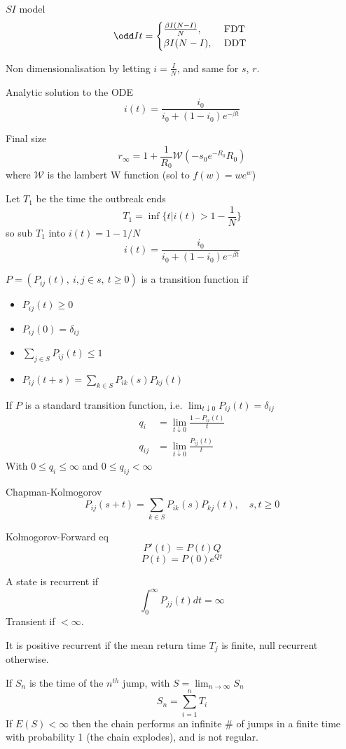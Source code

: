 \documentclass{X:/Documents/Coding/Latex/myassignment}
\begin{document}
$SI$ model
\[\odd It = \begin{cases}
	\frac{\beta I (N-I)}{N}, &\text{ FDT }\\
	\beta I (N-I), &\text{ DDT }\\	
\end{cases}\]

Non dimensionalisation by letting $i=\frac{I}{N}$, and same for $s$, $r$.


Analytic solution to the ODE
\[i(t) = \frac{i_0}{i_0 + (1-i_0)e^{-\beta t}}\]

Final size
\[r_\infty = 1 + \frac1{R_0} \mathcal{W}(-s_0e^{-R_0}R_0)\]
where $\mathcal{W}$ is the lambert W function (sol to $f(w) = we^{w}$)


Let $T_1$ be the time the outbreak ends
\[T_1 = \inf\{t|i(t) > 1-\frac1{N}\}\]
so sub $T_1$ into $i(t) = 1-1/N$
\[i(t) = \frac{i_0}{i_0+(1-i_0)e^{-\beta t}}\]

$P = \left(P_{ij}(t), \ i,j \in s, \ t\geq 0\right)$ is a transition function if
\begin{itemize}
	\item $P_{ij}(t)\geq 0$
	\item $P_{ij}(0) = \delta_{ij}$
	\item $\sum_{j\in S} P_{ij}(t) \leq 1 $
	\item $P_{ij}(t+s) = \sum_{k\in S} P_{ik}(s)P_{kj}(t)$
\end{itemize}

If $P$ is a standard transition function, i.e. $\lim_{t\downarrow 0} P_{ij}(t) = \delta_{ij}$
\begin{align*}
	q_i &= \lim_{t\downarrow 0} \frac{1-P_{ii}(t)}{t}\\
	q_{ij} &= \lim_{t\downarrow 0} \frac{P_{ij}(t)}{t}
\end{align*}
With $0\leq q_i \leq \infty$ and $0\leq q_{ij} < \infty$

Chapman-Kolmogorov
\[P_{ij}(s+t) = \sum_{k\in S} P_{ik}(s) P_{kj}(t), \quad s,t\geq 0\]

Kolmogorov-Forward eq
\[P'(t) = P(t) Q\]
\[P(t) = P(0)e^{Qt}\]

A state is recurrent if
\[\int_0^\infty P_{jj}(t) dt = \infty\]
Transient if $<\infty$.

It is positive recurrent if the mean return time $T_j$ is finite, null recurrent otherwise.


If $S_n$ is the time of the $n^{th}$ jump, with $S = \lim_{n\to\infty} S_n$
\[S_n = \sum_{i=1}^n T_i\]
If $E(S) < \infty$ then the chain performs an infinite $\#$ of jumps in a finite time with probability 1 (the chain explodes), and is not regular.
\end{document}
